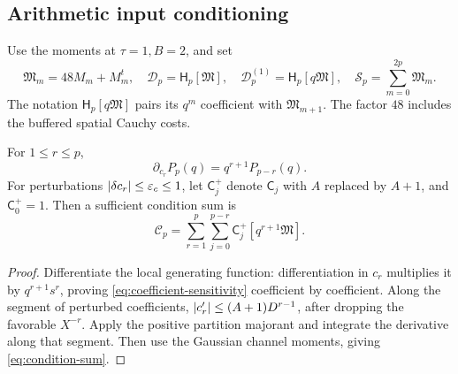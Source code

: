 \subsection{Arithmetic input conditioning}
Use the moments at \(\tau=1,B=2\), and set
\[
 \mathfrak M_m=48M_m+M_m^t,\quad
 \mathcal D_p=\mathsf H_p[\mathfrak M],\quad
 \mathcal D_p^{(1)}=\mathsf H_p[q\mathfrak M],\quad
 \mathcal S_p=\sum_{m=0}^{2p}\mathfrak M_m.
\]
The notation \(\mathsf H_p[q\mathfrak M]\) pairs its \(q^m\)
coefficient with \(\mathfrak M_{m+1}\).
The factor \(48\) includes the buffered spatial Cauchy costs.

\begin{lemma}\label{lem:sensitivity}
For \(1\le r\le p\),
\begin{equation}
 \partial_{c_r}P_p(q)=q^{r+1}P_{p-r}(q).
 \label{eq:coefficient-sensitivity}
\end{equation}
For perturbations \(\lvert \delta c_r\rvert\le\varepsilon_c\le1\),
let \(\mathsf C_j^+\) denote \(\mathsf C_j\) with \(A\) replaced
by \(A+1\), and \(\mathsf C_0^+=1\). Then a sufficient condition
sum is
\begin{equation}
 \mathcal C_p=\sum_{r=1}^p\sum_{j=0}^{p-r}
                     \mathsf C_j^+[q^{r+1}\mathfrak M].
 \label{eq:condition-sum}
\end{equation}
\end{lemma}
\begin{proof}
Differentiate the local generating function: differentiation
in \(c_r\) multiplies it by \(q^{r+1}s^r\), proving
\eqref{eq:coefficient-sensitivity} coefficient by coefficient.
Along the segment of perturbed coefficients,
\(\lvert c_r'\rvert\le(A+1)D^{r-1}\), after dropping the favorable
\(X^{-r}\). Apply the positive partition majorant and integrate
the derivative along that segment. Then use the Gaussian
channel moments, giving \eqref{eq:condition-sum}.
\end{proof}

